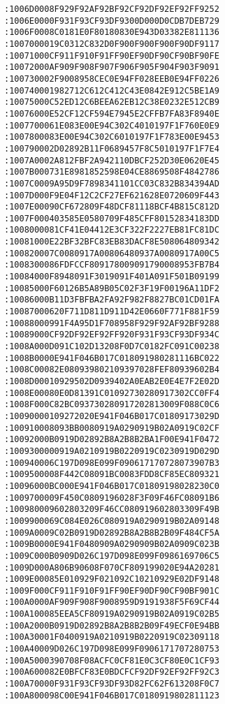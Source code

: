 \begin{lstlisting}[language={}, basicstyle=\scriptsize, caption=Машинний код]
:1006D0008F929F92AF92BF92CF92DF92EF92FF9252
:1006E0000F931F93CF93DF9300D000D0CDB7DEB729
:1006F0008C0181E0F80180830E943D03382E811136
:1007000019C0312C832D0F900F900F900F90DF9117
:10071000CF911F910F91FF90EF90DF90CF90BF90FE
:10072000AF909F908F907F906F905F904F903F9091
:100730002F9008958CEC0E94FF028EEB0E94FF0226
:100740001982712C612C412C43E0842E912C5BE1A9
:10075000C52ED12C6BEEA62EB12C38E0232E512CB9
:10076000E52CF12CF594E7945E2CFFB7FA83F8940E
:1007700061E083E00E94C302C4010197F1F760E0E9
:1007800083E00E94C302C6010197F1F783E00E9453
:100790002D02892B11F0689457F8C5010197F1F7E4
:1007A0002A812FBF2A942110DBCF252D30E0620E45
:1007B000731E8981852598E04CE8869508F4842786
:1007C0009A95D9F7898341101CC03C832B834394AD
:1007D000F9E04F12C2CF27EF621628E0720609F443
:1007E00090CF672809F48DCF81118BCF4B815C812D
:1007F000403585E0580709F485CFF80152834183DD
:1008000081CF41E04412E3CF322F2227EB81FC81DC
:10081000E22BF32BFC83EB83DACF8E508064809342
:100820007C0080917A00806480937A0080917A00C5
:1008300086FDFCCF809178009091790008953FB7B4
:10084000F8948091F3019091F401A091F501B09199
:10085000F60126B5A89B05C02F3F19F00196A11DF2
:10086000B11D3FBFBA2FA92F982F8827BC01CD01FA
:10087000620F711D811D911D42E0660F771F881F59
:10088000991F4A95D1F708958F929F92AF92BF9288
:10089000CF92DF92EF92FF920F931F93CF93DF934C
:1008A000D091C102D13208F0D7C0182FC091C00238
:1008B0000E941F046B017C018091980281116BC022
:1008C00082E080939802109397028FEF80939602B4
:1008D00010929502D0939402A0EAB2E0E4E7F2E02D
:1008E00080E0D81391C01092730280917302CC0FF4
:1008F000C82BC093730280917202813009F088C0C6
:10090000109272020E941F046B017C01809173029D
:100910008093BB0080919A0290919B02A0919C02CF
:10092000B0919D02892B8A2B8B2BA1F00E941F0472
:1009300000919A0210919B0220919C0230919D029D
:100940006C197D098E099F090617170728073907B3
:1009500008F442C08091BC0083FDD8CF85EC809321
:10096000BC000E941F046B017C01809198028230C0
:1009700009F450C0809196028F3F09F46FC08091B6
:100980009602803209F46CC080919602803309F49B
:1009900069C084E026C080919A0290919B02A09148
:1009A0009C02B0919D02892B8A2B8B2B09F484CF5A
:1009B0000E941F0480909A0290909B02A0909C023B
:1009C000B0909D026C197D098E099F0986169706C5
:1009D000A806B90608F070CF809199020E94A20281
:1009E00085E010929F021092C10210929E02DF9148
:1009F000CF911F910F91FF90EF90DF90CF90BF901C
:100A0000AF909F908F9008959D9191938F5F69CF44
:100A100085EEA5CF80919A0290919B02A0919C02B5
:100A2000B0919D02892B8A2B8B2B09F49ECF0E94BB
:100A30001F0400919A0210919B0220919C02309118
:100A40009D026C197D098E099F0906171707280753
:100A5000390708F08ACFC0CF81E0C3CF80E0C1CF93
:100A600082E0BFCF83E0BDCFCF92DF92EF92FF92C3
:100A70000F931F93CF93DF93D82FC62F613208F0C7
:100A800098C00E941F046B017C0180919802811123

\end{lstlisting}
